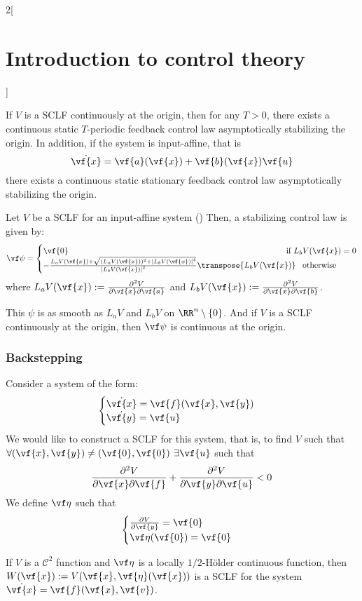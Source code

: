 \documentclass[../../../main_math.tex]{subfiles}
\begin{document}
\begin{multicols}{2}[\section{Introduction to control theory}]
\begin{theorem}
    If $V$ is a SCLF continuously at the origin, then for any $T>0$, there exists a continuous static $T$-periodic feedback control law asymptotically stabilizing the origin. In addition, if the system is input-affine, that is
    \begin{equation}\label{ICT:inputaffine}
      \dot{\vf{x}} = \vf{a}(\vf{x}) + \vf{b}(\vf{x})\vf{u}
    \end{equation}
    there exists a continuous static stationary feedback control law asymptotically stabilizing the origin.
  \end{theorem}
  \begin{theorem}
    Let $V$ be a SCLF for an input-affine system () Then, a stabilizing control law is given by:
    $$
      \vf\psi=\begin{cases}
        \vf{0}                                                                                                          & \!\!\!\!\!\!\!\!\!\!\!\!\!\text{if } L_bV(\vf{x})=0 \\
        -\frac{L_aV(\vf{x})+\sqrt{(L_aV(\vf{x}))^2+\abs{L_bV(\vf{x})}^4}}{\abs{L_bV(\vf{x})}^2}\transpose{L_bV(\vf{x})} & \!\text{otherwise}
      \end{cases}
    $$
    where $L_aV(\vf{x}):=\pdv{V}{\vf{x}}\vf{a}(\vf{x})$ and $L_bV(\vf{x}):=\pdv{V}{\vf{x}}\vf{b}(\vf{x})$.
  \end{theorem}
  \begin{remark}
    This $\psi$ is as smooth as $L_aV$ and $L_bV$ on $\RR^n\setminus\{0\}$. And if $V$ is a SCLF continuously at the origin, then $\vf\psi$ is continuous at the origin.
  \end{remark}
  \subsubsection{Backstepping}
  Consider a system of the form:
  \begin{equation}\label{ICT:backstepping}
    \begin{cases}
      \dot{\vf{x}} = \vf{f}(\vf{x}, \vf{y}) \\
      \dot{\vf{y}} = \vf{u}
    \end{cases}
  \end{equation}
  We would like to construct a SCLF for this system, that is, to find $V$ such that $\forall (\vf{x}, \vf{y})\ne (\vf{0}, \vf{0})$ $\exists \vf{u}$ such that $$
    \pdv{V}{\vf{x}}\vf{f}(\vf{x}, \vf{y}) + \pdv{V}{\vf{y}}\vf{u}<0
  $$
  We define $\vf\eta$ such that
  $$
    \begin{cases}
      \pdv{V}{\vf{y}}(\vf{x}, \vf{\eta}(\vf{x})) = \vf{0} \\
      \vf\eta(\vf{0}) = \vf{0}
    \end{cases}
  $$
  \begin{lemma}
    If $V$ is a $\mathcal{C}^2$ function and $\vf\eta$ is a locally $1/2$-Hölder continuous function, then $W(\vf{x}):=V(\vf{x}, \vf{\eta}(\vf{x}))$ is a SCLF for the system $\dot{\vf{x}} = \vf{f}(\vf{x}, \vf{v})$.
  \end{lemma}


\end{multicols}
\end{document}
